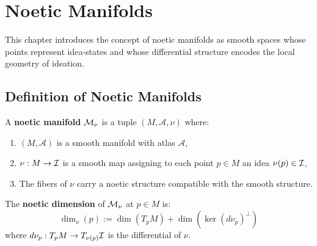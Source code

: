 

\chapter{Noetic Manifolds}
\label{ch:noetic-manifolds}

\begin{tcolorbox}[colback=blue!5!white,colframe=blue!75!black,title=\vnewfour]
This chapter introduces the concept of noetic manifolds as smooth spaces whose
points represent idea-states and whose differential structure encodes the local
geometry of ideation.
\end{tcolorbox}

\section{Definition of Noetic Manifolds}

\begin{definition}
\label{def:noetic-manifold}
A \textbf{noetic manifold} $\mathcal{M}_\nu$ is a tuple $(M, \mathcal{A}, \nu)$ where:
\begin{enumerate}[label=(\roman*)]
    \item $(M, \mathcal{A})$ is a smooth manifold with atlas $\mathcal{A}$,
    \item $\nu : M \to \mathcal{I}$ is a smooth map assigning to each point $p \in M$
          an idea $\nu(p) \in \mathcal{I}$,
    \item The fibers of $\nu$ carry a noetic structure compatible with the
          smooth structure.
\end{enumerate}
\end{definition}

\begin{definition}
\label{def:noetic-dimension}
The \textbf{noetic dimension} of $\mathcal{M}_\nu$ at $p \in M$ is:
\[
    \dim_\nu(p) := \dim(T_pM) + \dim(\ker(d\nu_p)^\perp)
\]
where $d\nu_p : T_pM \to T_{\nu(p)}\mathcal{I}$ is the differential of $\nu$.
\end{definition}

